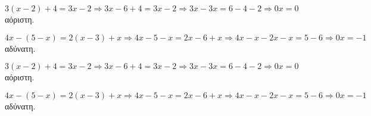 \begin{rlist}
\item $3(x-2)+4=3x-2\Rightarrow 3x-6+4=3x-2\Rightarrow 3x-3x=6-4-2\Rightarrow 0x=0$ αόριστη.
\item $ 4x-(5-x)=2(x-3)+x\Rightarrow 4x-5-x=2x-6+x\Rightarrow 4x-x-2x-x=5-6\Rightarrow 0x=-1 $ αδύνατη.
\end{rlist}
\begin{rlist}
\item $3(x-2)+4=3x-2\Rightarrow 3x-6+4=3x-2\Rightarrow 3x-3x=6-4-2\Rightarrow 0x=0$ αόριστη.
\item $ 4x-(5-x)=2(x-3)+x\Rightarrow 4x-5-x=2x-6+x\Rightarrow 4x-x-2x-x=5-6\Rightarrow 0x=-1 $ αδύνατη.
\end{rlist}
